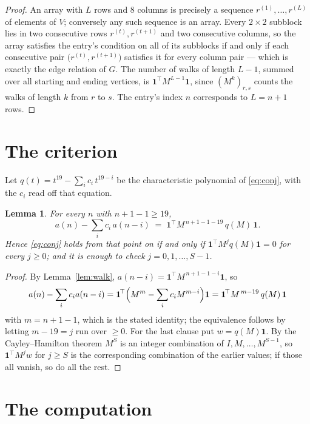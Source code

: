 \documentclass[11pt,a4paper]{article}
\theoremstyle{plain}
\newtheorem{lemma}[theorem]{Lemma}
\theoremstyle{definition}
\begin{document}
\begin{proof}
An array with $L$ rows and $8$ columns is precisely a sequence
$r^{(1)},\dots,r^{(L)}$ of elements of $V$; conversely any such sequence is an array.
Every $2\times2$ subblock lies in two consecutive rows $r^{(t)},r^{(t+1)}$ and two
consecutive columns, so the array satisfies the entry's condition on all of its subblocks
if and only if each consecutive pair $\bigl(r^{(t)},r^{(t+1)}\bigr)$ satisfies it for
every column pair --- which is exactly the edge relation of $G$. The number of walks of
length $L-1$, summed over all starting and ending vertices, is
$\mathbf{1}^{\!\top}M^{L-1}\mathbf{1}$, since $(M^{k})_{r,s}$ counts the walks of
length $k$ from $r$ to $s$. The entry's index $n$ corresponds to $L=n+1$ rows.
\end{proof}

\section{The criterion}

Let $q(t)=t^{19}-\sum_i c_i\,t^{19-i}$ be the characteristic polynomial of
\eqref{eq:conj}, with the $c_i$ read off that equation.

\begin{lemma}\label{lem:crit}
For every $n$ with $n+1-1\ge19$,
\[
a(n)-\sum_i c_i\,a(n-i)\;=\;\mathbf{1}^{\!\top}M^{\,n+1-1-19}\,q(M)\,\mathbf{1} .
\]
Hence \eqref{eq:conj} holds from that point on if and only if
$\mathbf{1}^{\!\top}M^{j}q(M)\mathbf{1}=0$ for every $j\ge0$; and it is enough to check
$j=0,1,\dots,S-1$.
\end{lemma}

\begin{proof}
By Lemma~\ref{lem:walk}, $a(n-i)=\mathbf{1}^{\!\top}M^{\,n+1-1-i}\mathbf{1}$, so
\[
a(n)-\sum_i c_i a(n-i)
=\mathbf{1}^{\!\top}\Bigl(M^{m}-\sum_i c_i M^{m-i}\Bigr)\mathbf{1}
=\mathbf{1}^{\!\top}M^{\,m-19}\,q(M)\,\mathbf{1}
\]
with $m=n+1-1$, which is the stated identity; the equivalence follows by letting
$m-19=j$ run over $\ge0$. For the last clause put $w=q(M)\mathbf{1}$. By the
Cayley--Hamilton theorem $M^{S}$ is an integer combination of $I,M,\dots,M^{S-1}$, so
$\mathbf{1}^{\!\top}M^{j}w$ for $j\ge S$ is the corresponding combination of the earlier
values; if those all vanish, so do all the rest.
\end{proof}

\section{The computation}
\end{document}

